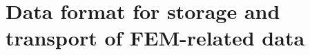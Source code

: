 \chapter[Data format examples]{Data format for storage and transport of FEM-related data}
\label{appendix-data-format}

